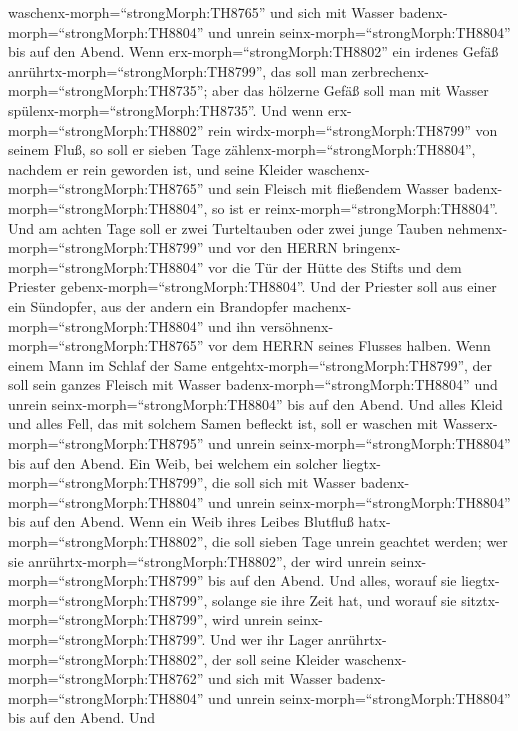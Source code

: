 waschenx-morph=``strongMorph:TH8765'' und sich mit Wasser
badenx-morph=``strongMorph:TH8804'' und unrein
seinx-morph=``strongMorph:TH8804'' bis auf den Abend.  Wenn
erx-morph=``strongMorph:TH8802'' ein irdenes Gefäß
anrührtx-morph=``strongMorph:TH8799'', das soll man
zerbrechenx-morph=``strongMorph:TH8735''; aber das hölzerne Gefäß soll
man mit Wasser spülenx-morph=``strongMorph:TH8735''.  Und
wenn erx-morph=``strongMorph:TH8802'' rein
wirdx-morph=``strongMorph:TH8799'' von seinem Fluß, so soll er sieben
Tage zählenx-morph=``strongMorph:TH8804'', nachdem er rein geworden ist,
und seine Kleider waschenx-morph=``strongMorph:TH8765'' und sein Fleisch
mit fließendem Wasser badenx-morph=``strongMorph:TH8804'', so ist er
reinx-morph=``strongMorph:TH8804''.  Und am achten Tage
soll er zwei Turteltauben oder zwei junge Tauben
nehmenx-morph=``strongMorph:TH8799'' und vor den HERRN
bringenx-morph=``strongMorph:TH8804'' vor die Tür der Hütte des Stifts
und dem Priester gebenx-morph=``strongMorph:TH8804''.  Und
der Priester soll aus einer ein Sündopfer, aus der andern ein Brandopfer
machenx-morph=``strongMorph:TH8804'' und ihn
versöhnenx-morph=``strongMorph:TH8765'' vor dem HERRN seines Flusses
halben.  Wenn einem Mann im Schlaf der Same
entgehtx-morph=``strongMorph:TH8799'', der soll sein ganzes Fleisch mit
Wasser badenx-morph=``strongMorph:TH8804'' und unrein
seinx-morph=``strongMorph:TH8804'' bis auf den Abend.  Und
alles Kleid und alles Fell, das mit solchem Samen befleckt ist, soll er
waschen mit Wasserx-morph=``strongMorph:TH8795'' und unrein
seinx-morph=``strongMorph:TH8804'' bis auf den Abend.  Ein
Weib, bei welchem ein solcher liegtx-morph=``strongMorph:TH8799'', die
soll sich mit Wasser badenx-morph=``strongMorph:TH8804'' und unrein
seinx-morph=``strongMorph:TH8804'' bis auf den Abend.  Wenn
ein Weib ihres Leibes Blutfluß hatx-morph=``strongMorph:TH8802'', die
soll sieben Tage unrein geachtet werden; wer sie
anrührtx-morph=``strongMorph:TH8802'', der wird unrein
seinx-morph=``strongMorph:TH8799'' bis auf den Abend.  Und
alles, worauf sie liegtx-morph=``strongMorph:TH8799'', solange sie ihre
Zeit hat, und worauf sie sitztx-morph=``strongMorph:TH8799'', wird
unrein seinx-morph=``strongMorph:TH8799''.  Und wer ihr
Lager anrührtx-morph=``strongMorph:TH8802'', der soll seine Kleider
waschenx-morph=``strongMorph:TH8762'' und sich mit Wasser
badenx-morph=``strongMorph:TH8804'' und unrein
seinx-morph=``strongMorph:TH8804'' bis auf den Abend.  Und
